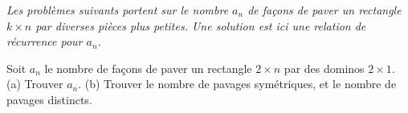 \emph{Les problèmes suivants portent sur le nombre $a_n$ de façons de paver un rectangle $k \times n$ par diverses pièces plus petites. Une solution est ici une relation de récurrence pour $a_n$.}

Soit $a_n$ le nombre de façons de paver un rectangle $2 \times n$ par des dominos $2 \times 1$. (a) Trouver $a_n$. (b) Trouver le nombre de pavages symétriques, et le nombre de pavages distincts.
